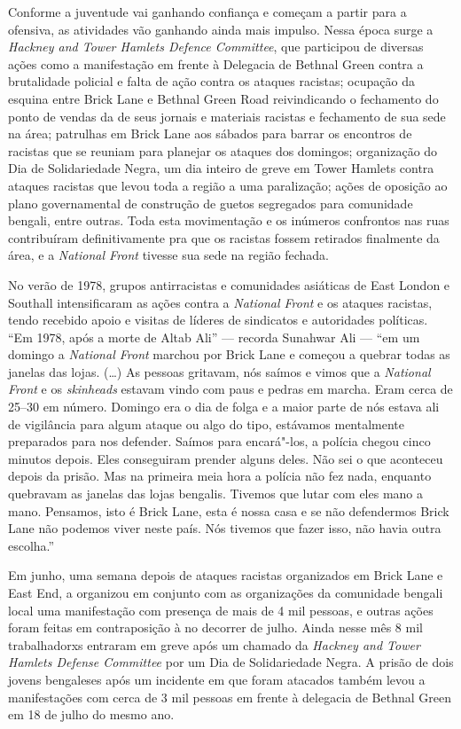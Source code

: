 Conforme a juventude vai ganhando confiança e começam a partir para a ofensiva, as atividades vão ganhando ainda mais impulso. Nessa época surge a \emph{Hackney and Tower Hamlets Defence Committee}, que participou de diversas ações como a manifestação em frente à Delegacia de Bethnal Green contra a brutalidade policial e falta de ação contra os ataques racistas; ocupação da esquina entre Brick Lane e Bethnal Green Road reivindicando o fechamento do ponto de vendas da  de seus jornais e materiais racistas e fechamento de sua sede na área; patrulhas em Brick Lane aos sábados para barrar os encontros de racistas que se reuniam para planejar os ataques dos domingos; organização do Dia de Solidariedade Negra, um dia inteiro de greve em Tower Hamlets contra ataques racistas que levou toda a região a uma paralização; ações de oposição ao plano governamental de construção de guetos segregados para comunidade bengali, entre outras. Toda esta movimentação e os inúmeros confrontos nas ruas contribuíram definitivamente pra que os racistas fossem retirados finalmente da área, e a \emph{National Front} tivesse sua sede na região fechada.

No verão de 1978, grupos antirracistas e comunidades asiáticas de East London e Southall intensificaram as ações contra a \emph{National Front} e os ataques racistas, tendo recebido apoio e visitas de líderes de sindicatos e autoridades políticas. ``Em 1978, após a morte de Altab Ali'' --- recorda Sunahwar Ali --- ``em um domingo a \emph{National Front} marchou por Brick Lane e começou a quebrar todas as janelas das lojas. (\ldots{}) As pessoas gritavam, nós saímos e vimos que a \emph{National Front} e os \emph{skinheads} estavam vindo com paus e pedras em marcha. Eram cerca de 25--30 em número. Domingo era o dia de folga e a maior parte de nós estava ali de vigilância para algum ataque ou algo do tipo, estávamos mentalmente preparados para nos defender. Saímos para encará"-los, a polícia chegou cinco minutos depois. Eles conseguiram prender alguns deles. Não sei o que aconteceu depois da prisão. Mas na primeira meia hora a polícia não fez nada, enquanto quebravam as janelas das lojas bengalis. Tivemos que lutar com eles mano a mano. Pensamos, isto é Brick Lane, esta é nossa casa e se não defendermos Brick Lane não podemos viver neste país. Nós tivemos que fazer isso, não havia outra escolha.''

Em junho, uma semana depois de ataques racistas organizados em Brick Lane e East End, a  organizou em conjunto com as organizações da comunidade bengali local uma manifestação com presença de mais de 4 mil pessoas, e outras ações foram feitas em contraposição à  no decorrer de julho. Ainda nesse mês 8 mil trabalhadorxs entraram em greve após um chamado da \emph{Hackney and Tower Hamlets Defense Committee} por um Dia de Solidariedade Negra. A prisão de dois jovens bengaleses após um incidente em que foram atacados também levou a manifestações com cerca de 3 mil pessoas em frente à delegacia de Bethnal Green em 18 de julho do mesmo ano.


